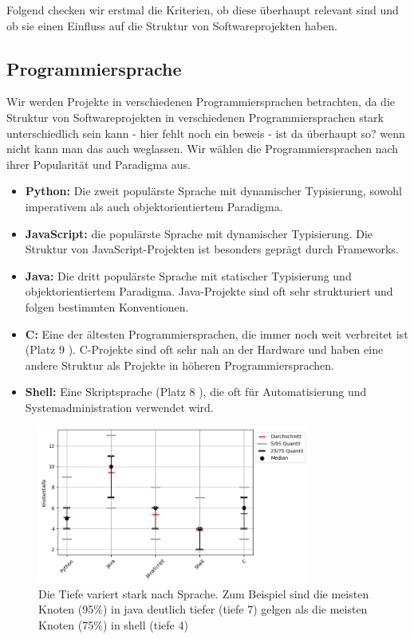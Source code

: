 Folgend checken wir erstmal die Kriterien, ob diese überhaupt relevant sind und ob sie einen Einfluss auf die Struktur von Softwareprojekten haben.

\subsection*{Programmiersprache} Wir werden Projekte in verschiedenen Programmiersprachen betrachten, da die Struktur von Softwareprojekten in verschiedenen Programmiersprachen stark unterschiedlich sein kann - hier fehlt noch ein beweis - ist da überhaupt so? wenn nicht kann man das auch weglassen. Wir wählen die Programmiersprachen nach ihrer Popularität und Paradigma aus. 
    \begin{itemize}
        \item \textbf{Python:} Die zweit populärste Sprache \cite{software_state_2022} mit dynamischer Typisierung, sowohl imperativem als auch objektorientiertem Paradigma. 
        \item \textbf{JavaScript:} die populärste Sprache \cite{software_state_2022} mit dynamischer Typisierung. Die Struktur von JavaScript-Projekten ist besonders geprägt durch Frameworks.
        \item \textbf{Java:} Die dritt populärste Sprache \cite{software_state_2022} mit statischer Typisierung und objektorientiertem Paradigma. Java-Projekte sind oft sehr strukturiert und folgen bestimmten Konventionen.
        \item \textbf{C:} Eine der ältesten Programmiersprachen, die immer noch weit verbreitet ist (Platz 9 \cite{software_state_2022}). C-Projekte sind oft sehr nah an der Hardware und haben eine andere Struktur als Projekte in höheren Programmiersprachen.
        \item \textbf{Shell:} Eine Skriptsprache (Platz 8 \cite{software_state_2022}), die oft für Automatisierung und Systemadministration verwendet wird.
    \end{itemize}

    \begin{figure}
        \centering
        \includegraphics[width=0.8\textwidth]{images/datenanalyse/spracheVsTiefe.png}
        \caption{Die Tiefe variert stark nach Sprache. Zum Beispiel sind die meisten Knoten (95\%) in java deutlich tiefer (tiefe 7) gelgen als die meisten Knoten (75\%) in shell (tiefe 4)}
        \label{fig:spracheVsTiefe}
    \end{figure}

